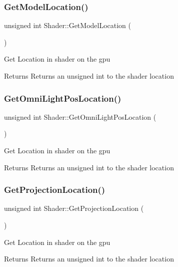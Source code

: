 \subsubsection{\texorpdfstring{GetModelLocation()}{GetModelLocation()}}
{\footnotesize\ttfamily unsigned int Shader\+::\+Get\+Model\+Location (\begin{DoxyParamCaption}{ }\end{DoxyParamCaption})}

Get Location in shader on the gpu \begin{DoxyReturn}{Returns}
Returns an unsigned int to the shader location 
\end{DoxyReturn}
\mbox{\label{class_shader_a20d72a30ea38c2af2c9c393d34b384c0}} 
\subsubsection{\texorpdfstring{GetOmniLightPosLocation()}{GetOmniLightPosLocation()}}
{\footnotesize\ttfamily unsigned int Shader\+::\+Get\+Omni\+Light\+Pos\+Location (\begin{DoxyParamCaption}{ }\end{DoxyParamCaption})}

Get Location in shader on the gpu \begin{DoxyReturn}{Returns}
Returns an unsigned int to the shader location 
\end{DoxyReturn}
\mbox{\label{class_shader_a72552e2fc926a863026bd008aa91983e}} 
\subsubsection{\texorpdfstring{GetProjectionLocation()}{GetProjectionLocation()}}
{\footnotesize\ttfamily unsigned int Shader\+::\+Get\+Projection\+Location (\begin{DoxyParamCaption}{ }\end{DoxyParamCaption})}

Get Location in shader on the gpu \begin{DoxyReturn}{Returns}
Returns an unsigned int to the shader location 
\end{DoxyReturn}
\mbox{\label{class_shader_a5d98d713e03605ab9e2ec48f98143d39}} 
